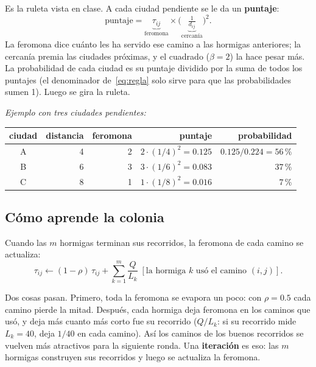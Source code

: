 \documentclass[11pt,a4paper]{article}
\begin{document}
\begin{simple}
Es la ruleta vista en clase. A cada ciudad pendiente se le da un \textbf{puntaje}:
\[
\text{puntaje}=\underbrace{\tau_{ij}}_{\text{feromona}}\times\Big(\underbrace{\tfrac{1}{d_{ij}}}_{\text{cercanía}}\Big)^{2}.
\]
La feromona dice cuánto les ha servido ese camino a las hormigas anteriores; la
cercanía premia las ciudades próximas, y el cuadrado ($\beta=2$) la hace pesar más.
La probabilidad de cada ciudad es su puntaje dividido por la suma de todos los
puntajes (el denominador de~\eqref{eq:regla} solo sirve para que las probabilidades
sumen 1). Luego se gira la ruleta.

\smallskip
\emph{Ejemplo con tres ciudades pendientes:}

\centering\small
\begin{tabular}{crrrr}
ciudad & distancia & feromona & puntaje & probabilidad \\ \hline
A & 4 & 2 & $2\cdot(1/4)^2=0.125$ & $0.125/0.224=56\,\%$ \\
B & 6 & 3 & $3\cdot(1/6)^2=0.083$ & $37\,\%$ \\
C & 8 & 1 & $1\cdot(1/8)^2=0.016$ & $7\,\%$ \\
\end{tabular}
\end{simple}

\subsection{Cómo aprende la colonia}

Cuando las $m$ hormigas terminan sus recorridos, la feromona de cada camino se
actualiza:
\begin{equation}
\tau_{ij}\leftarrow(1-\rho)\,\tau_{ij}+\sum_{k=1}^{m}\frac{Q}{L_k}\;[\text{la hormiga }k\text{ usó el camino }(i,j)].
\label{eq:actualizacion}
\end{equation}

\begin{simple}
Dos cosas pasan. Primero, toda la feromona se evapora un poco: con $\rho=0.5$ cada
camino pierde la mitad. Después, cada hormiga deja feromona en los caminos que usó,
y deja más cuanto más corto fue su recorrido ($Q/L_k$: si su recorrido mide $L_k=40$,
deja $1/40$ en cada camino). Así los caminos de los buenos recorridos se vuelven más
atractivos para la siguiente ronda. Una \textbf{iteración} es eso: las $m$ hormigas
construyen sus recorridos y luego se actualiza la feromona.
\end{simple}
\end{document}
